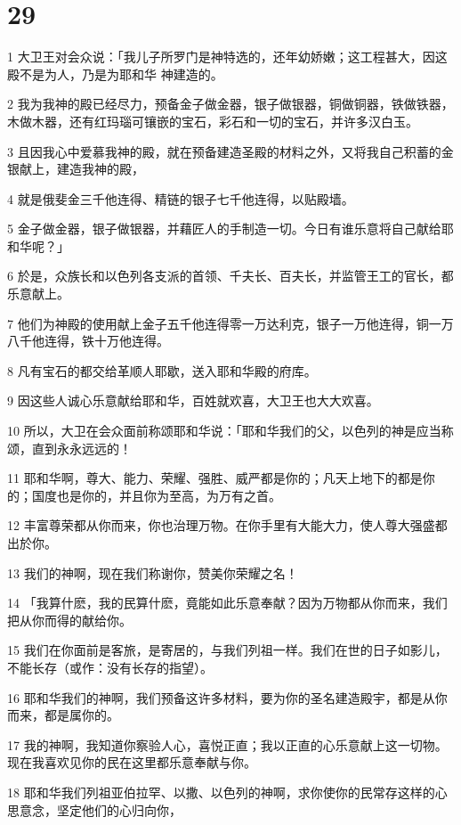 \chapter{29}

\par 1 大卫王对会众说：「我儿子所罗门是神特选的，还年幼娇嫩；这工程甚大，因这殿不是为人，乃是为耶和华 神建造的。
\par 2 我为我神的殿已经尽力，预备金子做金器，银子做银器，铜做铜器，铁做铁器，木做木器，还有红玛瑙可镶嵌的宝石，彩石和一切的宝石，并许多汉白玉。
\par 3 且因我心中爱慕我神的殿，就在预备建造圣殿的材料之外，又将我自己积蓄的金银献上，建造我神的殿，
\par 4 就是俄斐金三千他连得、精链的银子七千他连得，以贴殿墙。
\par 5 金子做金器，银子做银器，并藉匠人的手制造一切。今日有谁乐意将自己献给耶和华呢？」
\par 6 於是，众族长和以色列各支派的首领、千夫长、百夫长，并监管王工的官长，都乐意献上。
\par 7 他们为神殿的使用献上金子五千他连得零一万达利克，银子一万他连得，铜一万八千他连得，铁十万他连得。
\par 8 凡有宝石的都交给革顺人耶歇，送入耶和华殿的府库。
\par 9 因这些人诚心乐意献给耶和华，百姓就欢喜，大卫王也大大欢喜。
\par 10 所以，大卫在会众面前称颂耶和华说：「耶和华我们的父，以色列的神是应当称颂，直到永永远远的！
\par 11 耶和华啊，尊大、能力、荣耀、强胜、威严都是你的；凡天上地下的都是你的；国度也是你的，并且你为至高，为万有之首。
\par 12 丰富尊荣都从你而来，你也治理万物。在你手里有大能大力，使人尊大强盛都出於你。
\par 13 我们的神啊，现在我们称谢你，赞美你荣耀之名！
\par 14 「我算什麽，我的民算什麽，竟能如此乐意奉献？因为万物都从你而来，我们把从你而得的献给你。
\par 15 我们在你面前是客旅，是寄居的，与我们列祖一样。我们在世的日子如影儿，不能长存（或作：没有长存的指望）。
\par 16 耶和华我们的神啊，我们预备这许多材料，要为你的圣名建造殿宇，都是从你而来，都是属你的。
\par 17 我的神啊，我知道你察验人心，喜悦正直；我以正直的心乐意献上这一切物。现在我喜欢见你的民在这里都乐意奉献与你。
\par 18 耶和华我们列祖亚伯拉罕、以撒、以色列的神啊，求你使你的民常存这样的心思意念，坚定他们的心归向你，
